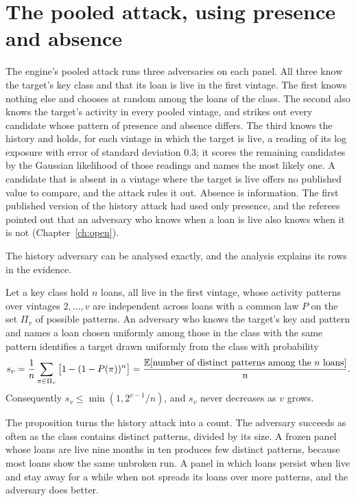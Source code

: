 \section{The pooled attack, using presence and absence}

The engine's pooled attack runs three adversaries on each panel. All three know the target's
key class and that its loan is live in the first vintage. The first knows nothing else and chooses
at random among the loans of the class. The second also knows the target's activity in every
pooled vintage, and strikes out every candidate whose pattern of presence and absence
differs. The third knows the history and holds, for each vintage in which the target is live,
a reading of its log exposure with error of standard deviation $0.3$; it scores the remaining
candidates by the Gaussian likelihood of those readings and names the most likely one. A
candidate that is absent in a vintage where the target is live offers no published value to
compare, and the attack rules it out. Absence is information. The first published version of
the history attack had used only presence, and the referees pointed out that an adversary
who knows when a loan is live also knows when it is not (Chapter~\ref{ch:open}).

The history adversary can be analysed exactly, and the analysis explains its rows in the
evidence.

\begin{proposition}\label{c19:prop-pattern}
Let a key class hold $n$ loans, all live in the first
vintage, whose activity patterns over vintages $2,\dots,v$ are independent across loans with a common
law $P$ on the set $\Pi_v$ of possible patterns. An adversary who knows the target's key and pattern and
names a loan chosen uniformly among those in the class with the same pattern identifies a target
drawn uniformly from the class with probability
\begin{equation}\label{c19:eq-s}
s_v=\frac1n\sum_{\pi\in\Pi_v}\big[1-(1-P(\pi))^n\big]=\frac{\mathbb{E}[\text{number of distinct patterns among the }n\text{ loans}]}{n}.
\end{equation}
Consequently $s_v\le\min(1,2^{v-1}/n)$, and $s_v$ never decreases as $v$ grows.
\end{proposition}

The proposition turns the history attack into a count. The adversary succeeds as often
as the class contains distinct patterns, divided by its size. A frozen panel whose loans are
live nine months in ten produces few distinct patterns, because most loans show the same
unbroken run. A panel in which loans persist when live and stay away for a while when not
spreads its loans over more patterns, and the adversary does better.

